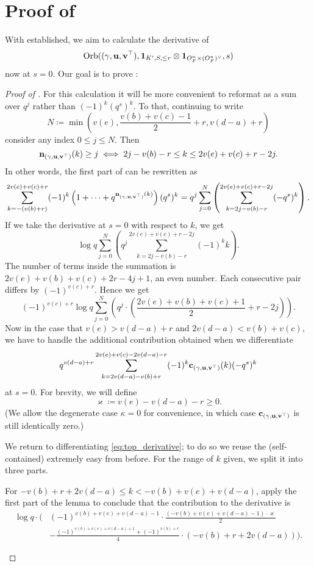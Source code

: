\section{Proof of }
With  established, we aim to calculate the derivative of
\[ \operatorname{Orb}({(\gamma, \mathbf u, \mathbf v^\top)}, \mathbf{1}_{K', S, \le r} \otimes \mathbf{1}_{O_F^n \times (O_F^n)^\vee}, s) \]
now at $s = 0$.
Our goal is to prove :
\semiliederiv*

\begin{proof}[Proof of ]
For this calculation it will be more convenient to reformat 
as a sum over $q^j$ rather than $(-1)^k (q^s)^k$.
To that, continuing to write
\[ N \coloneqq \min \left(
    v(e), \frac{v(b)+v(c)-1}{2} + r,
    v(d-a) + r \right) \]
consider any index $0 \le j \le N$.
Then
\[ \mathbf n_{(\gamma, \mathbf u, \mathbf v^\top)}(k) \ge j \iff 2j - v(b) - r \le k \le 2v(e)+v(c)+r-2j. \]
In other words, the first part of  can be rewritten as
\[ \sum_{k = -(v(b)+r)}^{2v(e)+v(c)+r} (-1)^k
  \left( 1 + \dots + q^{\mathbf n_{(\gamma, \mathbf u, \mathbf v^\top)}(k)} \right) (q^s)^k
  = q^j \sum_{j=0}^N \left( \sum_{k=2j-v(b)-r}^{2v(e)+v(c)+r-2j} (-q^s)^k \right). \]
If we take the derivative at $s = 0$ with respect to $k$, we get
\[ \log q \sum_{j=0}^N \left( q^j \sum_{k=2j-v(b)-r}^{2v(e)+v(c)+r-2j} (-1)^k k \right). \]
The number of terms inside the summation is
$2v(e)+v(b)+v(c)+2r-4j+1$, an even number.
Each consecutive pair differs by $(-1)^{v(c)+r}$.
Hence we get
\[ (-1)^{v(c)+r} \log q \sum_{j=0}^N \left( q^j
  \cdot \left( \frac{2v(e)+v(b)+v(c)+1}{2} + r - 2j \right) \right). \]
Now in the case that $v(e) > v(d-a) + r$ and $2v(d-a) < v(b) + v(c)$,
we have to handle the additional contribution obtained when we differentiate
\begin{equation}
  q^{v(d-a)+r}
  \sum_{k = 2v(d-a)-v(b)+r}^{2v(e)+v(c)-2v(d-a)-r} (-1)^k \mathbf c_{(\gamma, \mathbf u, \mathbf v^\top)}(k) (-q^s)^k
  \label{eq:top_derivative}
\end{equation}
at $s = 0$.
For brevity, we will define
\[ \varkappa \coloneqq v(e) - v(d-a) - r \ge 0. \]
(We allow the degenerate case $\kappa = 0$ for convenience,
in which case $\mathbf c_{(\gamma, \mathbf u, \mathbf v^\top)}$ is still identically zero.)

We return to differentiating \eqref{eq:top_derivative};
to do so we reuse the (self-contained) extremely easy 
from before.
For the range of $k$ given, we split it into three parts.
\begin{itemize}
  \ii For $-v(b) + r + 2v(d-a) \le k < -v(b) + v(e) + v(d-a)$,
  apply the first part of the lemma to conclude that the contribution to the derivative is
  \begin{align*}
    \log q \cdot \Big( & (-1)^{v(b)+v(e)+v(d-a)-1} \cdot
      \frac{(-v(b)+v(e)+v(d-a)-1) \cdot \varkappa}{2} \\
      &
      - \frac{(-1)^{v(b)+v(e)+v(d-a)+1} + (-1)^{v(b)+r}}{4} \cdot (-v(b) + r + 2v(d-a))
    \Big).
  \end{align*}


\end{itemize}
\end{proof}
